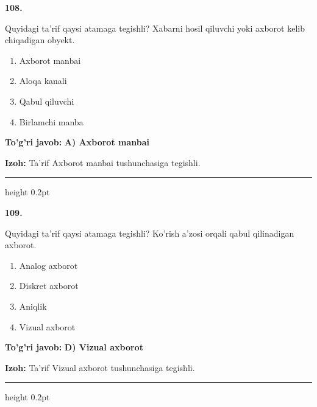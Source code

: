 \documentclass[10pt,a4paper,oneside]{article}
\begin{document}
\noindent\textbf{\color{ink}108.}
\par
Quyidagi ta'rif qaysi atamaga tegishli? Xabarni hosil qiluvchi yoki axborot kelib chiqadigan obyekt.
\begin{enumerate}[label=\Alph*),leftmargin=9mm]
\item Axborot manbai
\item Aloqa kanali
\item Qabul qiluvchi
\item Birlamchi manba
\end{enumerate}
\begin{tcolorbox}[enhanced,breakable,colback=teal!4,colframe=teal!50!black,boxrule=0.5pt,arc=1.1mm,left=3mm,right=3mm,top=1.7mm,bottom=1.7mm,before skip=2mm,after skip=2mm]
\textbf{\color{teal}To'g'ri javob:} \textbf{A) Axborot manbai}
\par\smallskip
\textbf{Izoh:} Ta'rif Axborot manbai tushunchasiga tegishli.
\end{tcolorbox}
\vspace{2mm}\hrule height 0.2pt \vspace{3mm}

\noindent\textbf{\color{ink}109.}
\par
Quyidagi ta'rif qaysi atamaga tegishli? Ko'rish a'zosi orqali qabul qilinadigan axborot.
\begin{enumerate}[label=\Alph*),leftmargin=9mm]
\item Analog axborot
\item Diskret axborot
\item Aniqlik
\item Vizual axborot
\end{enumerate}
\begin{tcolorbox}[enhanced,breakable,colback=teal!4,colframe=teal!50!black,boxrule=0.5pt,arc=1.1mm,left=3mm,right=3mm,top=1.7mm,bottom=1.7mm,before skip=2mm,after skip=2mm]
\textbf{\color{teal}To'g'ri javob:} \textbf{D) Vizual axborot}
\par\smallskip
\textbf{Izoh:} Ta'rif Vizual axborot tushunchasiga tegishli.
\end{tcolorbox}
\vspace{2mm}\hrule height 0.2pt \vspace{3mm}
\end{document}
